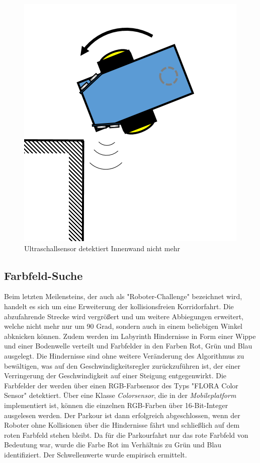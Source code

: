 \documentclass[12pt,a4paper,oneside]{article}
\begin{document}
\begin{spacing}{1.15}
\begin{center}
	\begin{figure}[!h]
		\centering
		\includegraphics[scale=.4]{figs/EckenProblem.png}
		\caption{Ultraschallsensor detektiert Innenwand nicht mehr}
		\label{fig:UltraschallsensorEckeVerfehlt}
	\end{figure}
\end{center}

\newpage

\subsection{Farbfeld-Suche}
	
Beim letzten Meilensteins, der auch als "Roboter-Challenge" bezeichnet wird, handelt es sich um eine Erweiterung der kollisionsfreien Korridorfahrt. Die abzufahrende Strecke wird vergrößert und um weitere Abbiegungen erweitert, welche nicht mehr nur um 90 Grad, sondern auch in einem beliebigen Winkel abknicken können. Zudem werden im Labyrinth Hindernisse in Form einer Wippe und einer Bodenwelle verteilt und Farbfelder in den Farben Rot, Grün und Blau ausgelegt. Die Hindernisse sind ohne weitere Veränderung des Algorithmus zu bewältigen, was auf den Geschwindigkeitsregler zurückzuführen ist, der einer Verringerung der Geschwindigkeit auf einer Steigung entgegenwirkt. Die Farbfelder der werden über einen RGB-Farbsensor des Typs "FLORA Color Sensor" detektiert. Über eine Klasse \textit{Colorsensor}, die in der \textit{Mobileplatform}  implementiert ist, können die einzelnen RGB-Farben über 16-Bit-Integer ausgelesen werden. Der Parkour ist dann erfolgreich abgeschlossen, wenn der Roboter ohne Kollisionen über die Hindernisse fährt und schließlich auf dem roten Farbfeld stehen bleibt. 
Da für die Parkourfahrt nur das rote Farbfeld von Bedeutung war, wurde die Farbe Rot im
Verhältnis zu Grün und Blau identifiziert. Der Schwellenwerte wurde empirisch ermittelt.\\


\end{spacing}
\end{document}
